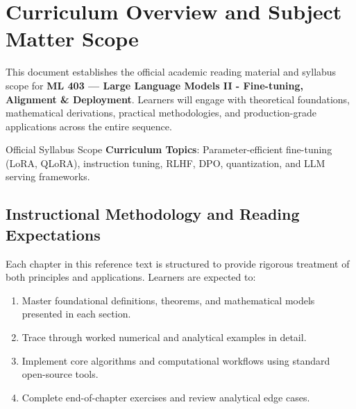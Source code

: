 \section{Curriculum Overview and Subject Matter Scope}

This document establishes the official academic reading material and syllabus scope for \textbf{ML 403 --- Large Language Models II - Fine-tuning, Alignment \& Deployment}. Learners will engage with theoretical foundations, mathematical derivations, practical methodologies, and production-grade applications across the entire sequence.

\begin{InsightBox}{Official Syllabus Scope}
  \textbf{Curriculum Topics}: Parameter-efficient fine-tuning (LoRA, QLoRA), instruction tuning, RLHF, DPO, quantization, and LLM serving frameworks.
\end{InsightBox}

\subsection{Instructional Methodology and Reading Expectations}

Each chapter in this reference text is structured to provide rigorous treatment of both principles and applications. Learners are expected to:
\begin{enumerate}
  \item Master foundational definitions, theorems, and mathematical models presented in each section.
  \item Trace through worked numerical and analytical examples in detail.
  \item Implement core algorithms and computational workflows using standard open-source tools.
  \item Complete end-of-chapter exercises and review analytical edge cases.
\end{enumerate}

